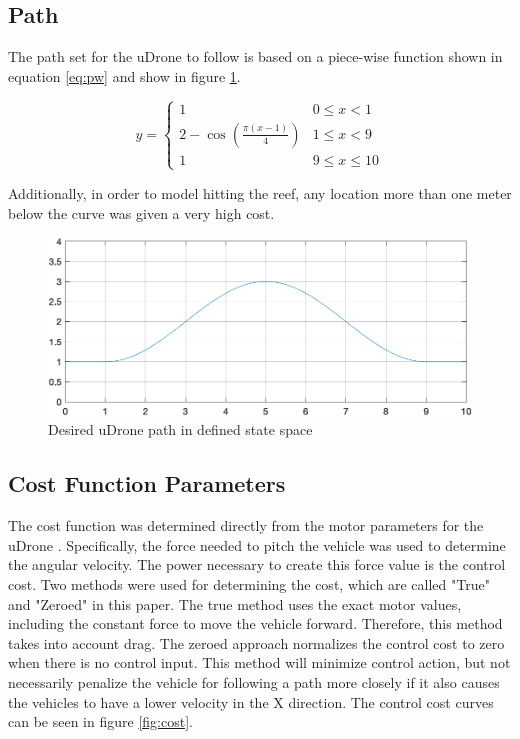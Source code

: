 \subsection{Path}

The path set for the uDrone to follow is based on a piece-wise function shown in equation \ref{eq:pw} and show in figure \ref{fig:path}.

\begin{equation}
y =
    \begin{cases} 
      1 & 0 \leq x < 1 \\
      2-\cos \left( \frac {\pi \left( x-1\right) } {4}\right)  & 1\leq x < 9 \\
      1 & 9 \leq x \leq 10
  \end{cases}\label{eq:pw}
\end{equation}

Additionally, in order to model hitting the reef, any location more than one meter below the curve was given a very high cost.

\begin{figure}[ht]
    \centerline{\includegraphics[width=\linewidth]{img/path.png}}
    \caption[Desired uDrone 2D path]{Desired uDrone path in defined state space}
    \label{fig:path}
\end{figure}

\subsection{Cost Function Parameters}

The cost function was determined directly from the motor parameters for the uDrone \parencite{t200}. Specifically, the force needed to pitch the vehicle was used to determine the angular velocity. The power necessary to create this force value is the control cost. Two methods were used for determining the cost, which are called "True" and "Zeroed" in this paper. The true method uses the exact motor values, including the constant force to move the vehicle forward. Therefore, this method takes into account drag. The zeroed approach normalizes the control cost to zero when there is no control input. This method will minimize control action, but not necessarily penalize the vehicle for following a path more closely if it also causes the vehicles to have a lower velocity in the X direction. The control cost curves can be seen in figure \ref{fig:cost}.

